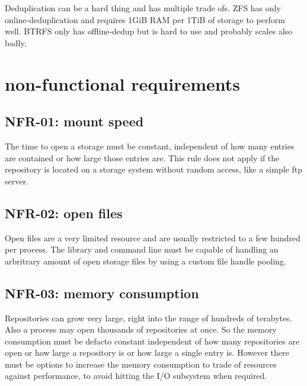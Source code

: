 \documentclass[9pt,pagesize,DIV12,normalheadings,BCOR5mm,headexclude,footexclude]{scrbook}
\begin{document}
Deduplication can be a hard thing and has multiple trade ofs. 
ZFS has only online-deduplication and requires 1GiB RAM per 1TiB of 
storage to perform well. BTRFS only has offline-dedup but is hard
to use and probably scales also badly.

\section{non-functional requirements}

\subsection{NFR-01: mount speed}
The time to open a storage must be constant, independent of how many entries
are contained or how large those entries are. This rule does not apply
if the repository is located on a storage system without random access,
like a simple ftp server.

\subsection{NFR-02: open files}
Open files are a very limited resource and are usually restricted to a few
hundred per process. The library and command line must be capable of handling
an arbritrary amount of open storage files by using a custom file handle 
pooling.

\subsection{NFR-03: memory consumption}
Repositories can grow very large, right into the range of hundreds of terabytes.
Also a process may open thousands of repositories at once. So the memory
consumption must be defacto constant independent of how many repositories are
open or how large a repository is or how large a single entry is. However 
there must be options to increase the memory consumption to trade of resources
against performance, to avoid hitting the I/O subsystem when required.
\end{document}
